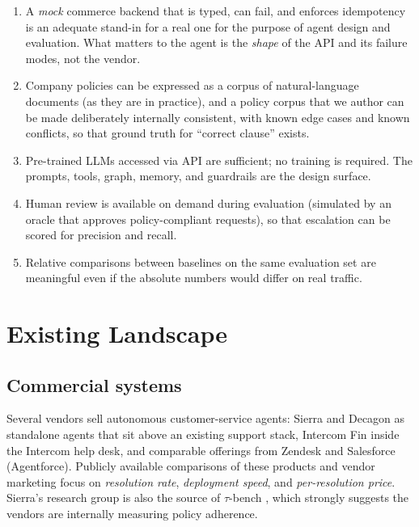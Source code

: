 \documentclass[11pt,a4paper]{article}
\begin{document}
\begin{enumerate}[label=\textbf{A\arabic*.}]
  \item A \emph{mock} commerce backend that is typed, can fail, and enforces idempotency is an adequate stand-in for a real one for the purpose of agent design and evaluation. What matters to the agent is the \emph{shape} of the API and its failure modes, not the vendor.
  \item Company policies can be expressed as a corpus of natural-language documents (as they are in practice), and a policy corpus that we author can be made deliberately internally consistent, with known edge cases and known conflicts, so that ground truth for ``correct clause'' exists.
  \item Pre-trained LLMs accessed via API are sufficient; no training is required. The prompts, tools, graph, memory, and guardrails are the design surface.
  \item Human review is available on demand during evaluation (simulated by an oracle that approves policy-compliant requests), so that escalation can be scored for precision and recall.
  \item Relative comparisons between baselines on the same evaluation set are meaningful even if the absolute numbers would differ on real traffic.
\end{enumerate}

\section{Existing Landscape}\label{sec:landscape}

\subsection{Commercial systems}

Several vendors sell autonomous customer-service agents: Sierra and Decagon as standalone agents that sit above an existing support stack, Intercom Fin inside the Intercom help desk, and comparable offerings from Zendesk and Salesforce (Agentforce). Publicly available comparisons of these products \citep[e.g.][]{yao2024taubench} and vendor marketing focus on \emph{resolution rate}, \emph{deployment speed}, and \emph{per-resolution price}. Sierra's research group is also the source of $\tau$-bench \citep{yao2024taubench}, which strongly suggests the vendors are internally measuring policy adherence.
\end{document}
